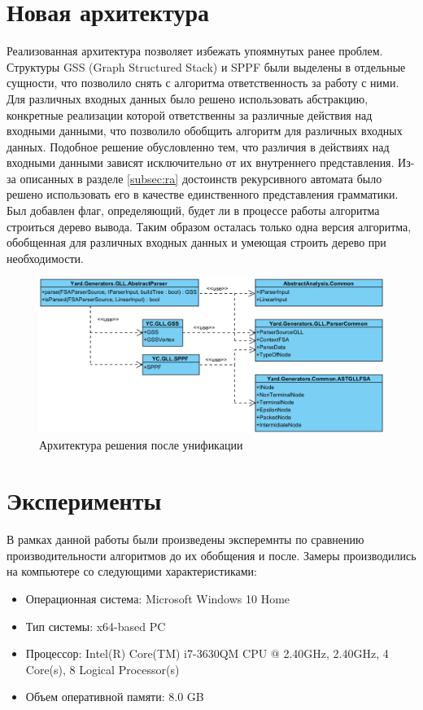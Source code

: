 \documentclass[14pt]{matmex-diploma}
\begin{document}
\section{Новая архитектура}
Реализованная архитектура позволяет избежать упоямнутых ранее проблем. Структуры GSS (Graph Structured Stack) и SPPF были выделены в отдельные сущности, что позволило снять с алгоритма ответственность за работу с ними. Для различных входных данных было решено использовать абстракцию, конкретные реализации которой ответственны за различные действия над входными данными, что позволило обобщить алгоритм для различных входных данных. Подобное решение обусловленно тем, что различия в действиях над входными данными зависят исключительно от их внутреннего представления. Из-за описанных в разделе \ref{subsec:ra} достоинств рекурсивного автомата было решено использовать его в качестве единственного представления грамматики. Был добавлен флаг, определяющий, будет ли в процессе работы алгоритма строиться дерево вывода. Таким образом осталась только одна версия алгоритма, обобщенная для различных входных данных и умеющая строить дерево при необходимости.
\begin{figure}[h]
    \includegraphics[width=\textwidth]{images/New}
    \caption{Архитектура решения после унификации}
    \label{fig:New}
\end{figure}

\section{Эксперименты}
В рамках данной работы были произведены эксперемнты по сравнению производительности алгоритмов до их обобщения и после.
Замеры производились на компьютере со следующими характеристиками:
\begin{itemize}
    \item Операционная система: Microsoft Windows 10 Home
    \item Тип системы: x64-based PC
    \item Процессор: Intel(R) Core(TM) i7-3630QM CPU @ 2.40GHz, 2.40GHz, 4 Core(s), 8 Logical Processor(s)
    \item Объем оперативной памяти: 8.0 GB
\end{itemize}
\end{document}
